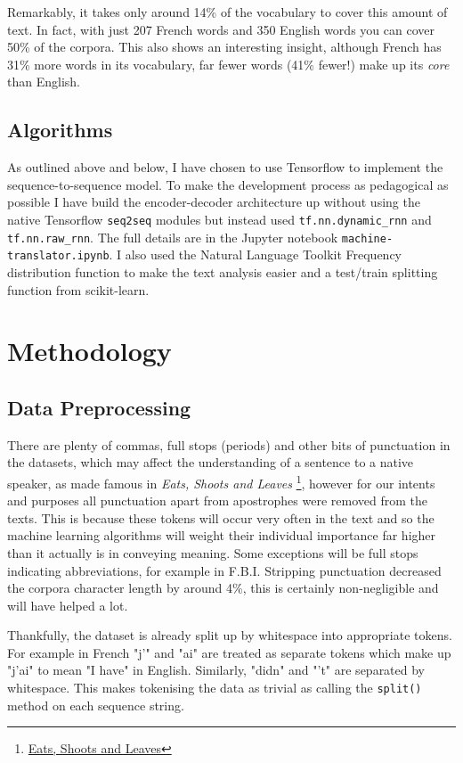 \documentclass[]{article}
\begin{document}
Remarkably, it takes only around 14\% of the vocabulary to cover this amount of text. In fact, with just 207 French words and 350 English words you can cover 50\% of the corpora. This also shows an interesting insight, although French has 31\% more words in its vocabulary, far fewer words (41\% fewer!) make up its \textit{core} than English.



\subsection{Algorithms}
As outlined above and below, I have chosen to use Tensorflow to implement the sequence-to-sequence model. To make the development process as pedagogical as possible I have build the encoder-decoder architecture up without using the native Tensorflow \lstinline{seq2seq} modules but instead used \lstinline{tf.nn.dynamic_rnn} and \lstinline{tf.nn.raw_rnn}. The full details are in the Jupyter notebook \lstinline{machine-translator.ipynb}. I also used the Natural Language Toolkit Frequency distribution function to make the text analysis easier and a test/train splitting function from scikit-learn.
\section{Methodology}
\subsection{Data Preprocessing}
There are plenty of commas, full stops (periods) and other bits of punctuation in the datasets, which may affect the understanding of a sentence to a native speaker, as made famous in \textit{Eats, Shoots and Leaves} \footnote{\href{https://en.wikipedia.org/wiki/Eats,_Shoots_\%26_Leaves}{Eats, Shoots and Leaves}}, however for our intents and purposes all punctuation apart from apostrophes were removed from the texts. This is because these tokens will occur very often in the text and so the machine learning algorithms will weight their individual importance far higher than it actually is in conveying meaning. Some exceptions will be full stops indicating abbreviations, for example in F.B.I. Stripping punctuation decreased the corpora character length by around 4\%, this is certainly non-negligible and will have helped a lot.

Thankfully, the dataset is already split up by whitespace into appropriate tokens. For example in French "j'" and "ai" are treated as separate tokens which make up "j'ai" to mean "I have" in English. Similarly, "didn" and "'t" are separated by whitespace. This makes tokenising the data as trivial as calling the \lstinline{split()} method on each sequence string.
\end{document}
